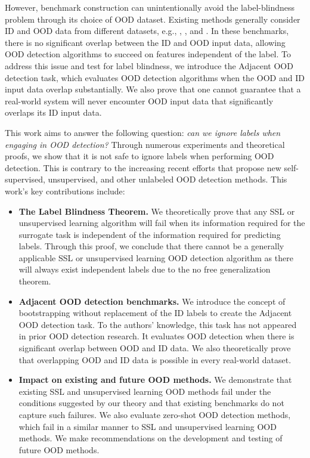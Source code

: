 However, benchmark construction can unintentionally avoid the label-blindness problem through its choice of OOD dataset. Existing methods generally consider ID and OOD data from different datasets, e.g., \citet{fort2021exploring}, \citet{sehwag2021ssd}, and \citet{hendrycks2019using}. In these benchmarks, there is no significant overlap between the ID and OOD input data, allowing OOD detection algorithms to succeed on features independent of the label. To address this issue and test for label blindness, we introduce the Adjacent OOD detection task, which evaluates OOD detection algorithms when the OOD and ID input data overlap substantially. We also prove that one cannot guarantee that a real-world system will never encounter OOD input data that significantly overlaps its ID input data.

This work aims to answer the following question: \emph{can we ignore labels when engaging in OOD detection?} Through numerous experiments and theoretical proofs, we show that it is not safe to ignore labels when performing OOD detection. This is contrary to the increasing recent efforts that propose new self-supervised, unsupervised, and other unlabeled OOD detection methods. This work's key contributions include:
\begin{itemize}
\item \textbf{The Label Blindness Theorem.} We theoretically prove that any SSL or unsupervised learning algorithm will fail when its information required for the surrogate task is independent of the information required for predicting labels. Through this proof, we conclude that there cannot be a generally applicable SSL or unsupervised learning OOD detection algorithm as there will always exist independent labels due to the no free generalization theorem.

\item \textbf{Adjacent OOD detection benchmarks.} We introduce the concept of bootstrapping without replacement of the ID labels to create the Adjacent OOD detection task. To the authors' knowledge, this task has not appeared in prior OOD detection research. It evaluates OOD detection when there is significant overlap between OOD and ID data. We also theoretically prove that overlapping OOD and ID data is possible in every real-world dataset.

\item \textbf{Impact on existing and future OOD methods.} We demonstrate that existing SSL and unsupervised learning OOD methods fail under the conditions suggested by our theory and that existing benchmarks do not capture such failures. We also evaluate zero-shot OOD detection methods, which fail in a similar manner to SSL and unsupervised learning OOD methods. We make recommendations on the development and testing of future OOD methods.
\end{itemize}

